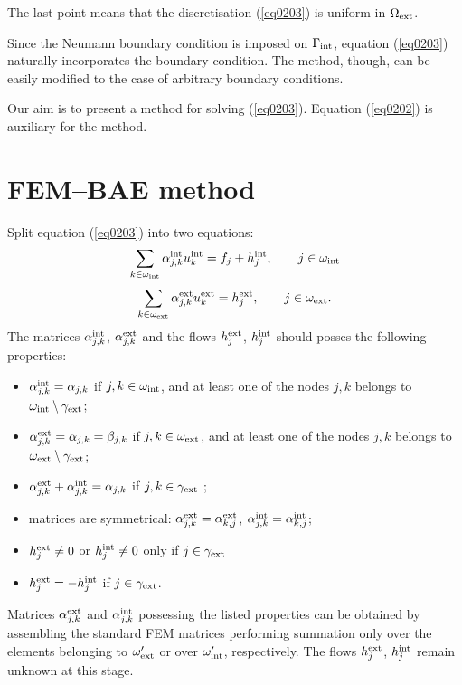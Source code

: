 \documentclass[12pt]{article}
\newcommand{\rin}{{\rm int}}
\newcommand{\rex}{{\rm ext}}
\begin{document}
The last point means that the discretisation (\ref{eq0203})
is uniform in $\Omega_\rex$.

Since the Neumann boundary condition is imposed on $\Gamma_\rin$, equation (\ref{eq0203}) naturally incorporates the
boundary condition. The method, though, can be easily modified to the case of arbitrary boundary conditions.

Our aim is to present a method for solving (\ref{eq0203}). Equation (\ref{eq0202}) is auxiliary for the method.



\section{FEM--BAE method}
\label{sec:method}

Split equation (\ref{eq0203}) into two equations:
\begin{equation}
\sum_{k \in \omega_\rin} \alpha_{j,k}^\rin u_{k}^\rin = f_j + h_j^\rin,
\qquad
j \in \omega_\rin
\label{eq0301}
\end{equation}
\begin{equation}
\sum_{k \in \omega_\rex} \alpha_{j,k}^\rex u_{k}^\rex =  h_j^\rex,
\qquad
j \in \omega_\rex.
\label{eq0302}
\end{equation}
The matrices $\alpha^\rin_{j,k}$, $\alpha^\rex_{j,k}$ and the flows $h^\rex_j$,
$h^\rin_j$ should posses the following properties:
\begin{itemize}
\item
$\alpha_{j,k}^\rin = \alpha_{j,k}$ if $j, k \in \omega_\rin$, and at least one of the nodes
$j, k$ belongs to $\omega_\rin \setminus \gamma_\rex$;
\item
$\alpha_{j,k}^\rex = \alpha_{j,k} = \beta_{j,k}$ if $j, k \in \omega_\rex$, and at least one of the nodes
$j, k$ belongs to $\omega_\rex \setminus \gamma_\rex$;
\item
$\alpha_{j,k}^\rex + \alpha_{j,k}^\rin = \alpha_{j,k}$ if $j, k \in \gamma_\rex$ ;
\item
matrices are symmetrical: $\alpha^\rex_{j,k} = \alpha^\rex_{k,j}$,
$\alpha^\rin_{j,k} = \alpha^\rin_{k,j}$;
\item
$h_j^\rex \ne 0$ or $h_j^\rin \ne 0$ only if $j \in \gamma_\rex$
\item
$h^\rex_j = - h^\rin_j$ if $j \in \gamma_\rex$.
\end{itemize}

Matrices $\alpha_{j,k}^\rex$ and $\alpha_{j,k}^\rin$ possessing the listed properties can be obtained by
assembling the standard FEM matrices performing summation only over the elements belonging to $\omega_\rex'$
or over $\omega_\rin'$, respectively. The flows $h^\rex_j$,
$h^\rin_j$ remain unknown at this stage.
\end{document}
